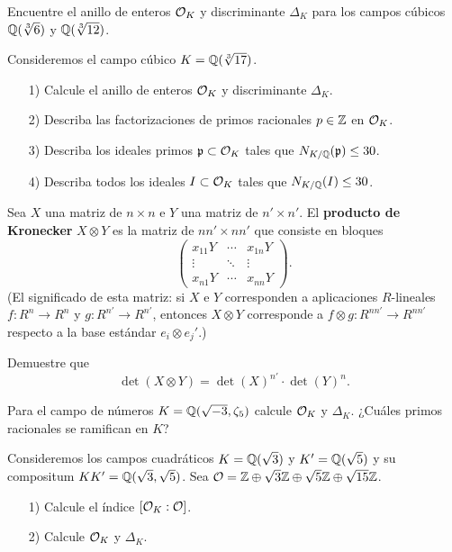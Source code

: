 \begin{ejercicio}
  Encuentre el anillo de enteros $\mathcal{O}_K$ y discriminante $\Delta_K$ para
  los campos cúbicos $\mathbb{Q} (\sqrt[3]{6})$ y $\mathbb{Q} (\sqrt[3]{12})$.
\end{ejercicio}

\begin{ejercicio}
  Consideremos el campo cúbico $K = \mathbb{Q} (\sqrt[3]{17})$.

  \begin{enumerate}
  \item[1)] Calcule el anillo de enteros $\mathcal{O}_K$ y discriminante $\Delta_K$.
  \item[2)] Describa las factorizaciones de primos racionales $p \in \mathbb{Z}$ en
    $\mathcal{O}_K$.
  \item[3)] Describa los ideales primos $\mathfrak{p} \subset \mathcal{O}_K$
    tales que $N_{K/\mathbb{Q}} (\mathfrak{p}) \le 30$.
  \item[4)] Describa todos los ideales $I \subset \mathcal{O}_K$
    tales que $N_{K/\mathbb{Q}} (I) \le 30$.
  \end{enumerate}
\end{ejercicio}

\begin{ejercicio}
  \label{ejerc:producto-de-kronecker}
  Sea $X$ una matriz de $n\times n$ e $Y$ una matriz de $n'\times n'$.
  El \textbf{producto de Kronecker} $X\otimes Y$ es la matriz de
  $nn' \times nn'$ que consiste en bloques
  \[ \begin{pmatrix}
    x_{11} Y & \cdots & x_{1n} Y \\
    \vdots & \ddots & \vdots \\
    x_{n1} Y & \cdots & x_{nn} Y
  \end{pmatrix}. \]
  (El significado de esta matriz: si $X$ e $Y$ corresponden a aplicaciones
  $R$-lineales $f\colon R^n \to R^n$ y $g\colon R^{n'}\to R^{n'}$, entonces
  $X\otimes Y$ corresponde a $f\otimes g\colon R^{nn'} \to R^{nn'}$
  respecto a la base estándar $e_i\otimes e_j'$.)

  Demuestre que
  $$\det (X\otimes Y) = \det (X)^{n'} \cdot \det (Y)^n.$$
\end{ejercicio}

\begin{ejercicio}
  Para el campo de números $K = \mathbb{Q} (\sqrt{-3},\zeta_5)$ calcule
  $\mathcal{O}_K$ y $\Delta_K$. ¿Cuáles primos racionales se ramifican en $K$?
\end{ejercicio}

\begin{ejercicio}
  Consideremos los campos cuadráticos $K = \mathbb{Q} (\sqrt{3})$ y
  $K' = \mathbb{Q} (\sqrt{5})$ y su compositum $KK' = \mathbb{Q} (\sqrt{3},\sqrt{5})$.
  Sea $\mathcal{O} = \mathbb{Z} \oplus \sqrt{3}\mathbb{Z} \oplus \sqrt{5}\mathbb{Z} \oplus \sqrt{15}\mathbb{Z}$.

  \begin{enumerate}
  \item[1)] Calcule el índice $[\mathcal{O}_K : \mathcal{O}]$.

  \item[2)] Calcule $\mathcal{O}_K$ y $\Delta_K$.
  \end{enumerate}
\end{ejercicio}

